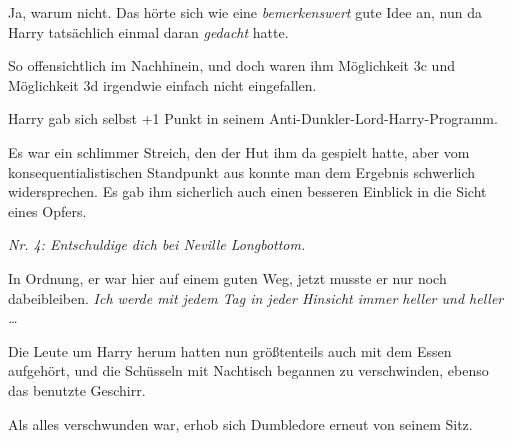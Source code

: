 Ja, warum nicht. Das hörte sich wie eine \emph{bemerkenswert} gute Idee an, nun da Harry tatsächlich einmal daran \emph{gedacht} hatte.

So offensichtlich im Nachhinein, und doch waren ihm Möglichkeit 3c und Möglichkeit 3d irgendwie einfach nicht eingefallen.

Harry gab sich selbst +1 Punkt in seinem Anti-Dunkler-Lord-Harry-Programm.

Es war ein schlimmer Streich, den der Hut ihm da gespielt hatte, aber vom konsequentialistischen Standpunkt aus konnte man dem Ergebnis schwerlich widersprechen. Es gab ihm sicherlich auch einen besseren Einblick in die Sicht eines Opfers.

\emph{Nr. 4: Entschuldige dich bei Neville Longbottom.}

In Ordnung, er war hier auf einem guten Weg, jetzt musste er nur noch dabeibleiben. \emph{Ich werde mit jedem Tag in jeder Hinsicht immer heller und heller …}%

Die Leute um Harry herum hatten nun größtenteils auch mit dem Essen aufgehört, und die Schüsseln mit Nachtisch begannen zu verschwinden, ebenso das benutzte Geschirr.

Als alles verschwunden war, erhob sich Dumbledore erneut von seinem Sitz.

